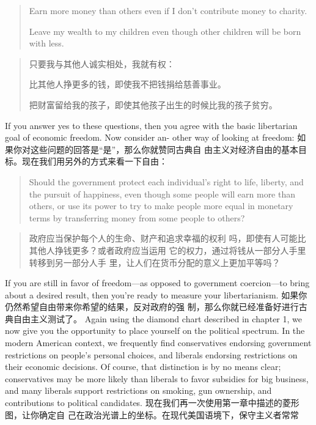 \begin{paracol}{2}
\begin{quotation}
	Earn more money than others even if I don't contribute money to charity.
	
	Leave my wealth to my children even though other children will be born with less.
\end{quotation}
\switchcolumn
\begin{quotation}
\noindent 只要我与其他人诚实相处，我就有权：

比其他人挣更多的钱，即使我不把钱捐给慈善事业。
	
把财富留给我的孩子，即使其他孩子出生的时候比我的孩子贫穷。
\end{quotation}
\switchcolumn*
If you answer yes to these questions, then you agree with the
basic libertarian goal of economic freedom. Now consider an-
other way of looking at freedom:
\switchcolumn
如果你对这些问题的回答是“是”，那么你就赞同古典自
由主义对经济自由的基本目标。现在我们用另外的方式来看一下自由：
\switchcolumn*
\begin{quote}
Should the government protect each individual's right to life,
liberty, and the pursuit of happiness, even though some people
will earn more than others, or use its power to try to make people more equal in monetary terms by transferring money from
some people to others?
\end{quote}
\switchcolumn
\begin{quote}
政府应当保护每个人的生命、财产和追求幸福的权利
吗，即使有人可能比其他人挣钱更多？或者政府应当运用
它的权力，通过将钱从一部分人手里转移到另一部分人手
里，让人们在货币分配的意义上更加平等吗？
\end{quote}
\switchcolumn*
If you are still in favor of freedom---as opposed to government coercion---to bring about a desired result, then you're
ready to measure your libertarianism.
\switchcolumn
如果你仍然希望自由带来你希望的结果，反对政府的强
制，那么你就已经准备好进行古典自由主义测试了。
\switchcolumn*
Again using the diamond chart described in chapter 1, we
now give you the opportunity to place yourself on the political
spectrum. In the modern American context, we frequently find
conservatives endorsing government restrictions on people's
personal choices, and liberals endorsing restrictions on their
economic decisions. Of course, that distinction is by no means
clear; conservatives may be more likely than liberals to favor
subsidies for big business, and many liberals support restrictions on smoking, gun ownership, and contributions to political
candidates.
\switchcolumn
现在我们再一次使用第一章中描述的菱形图，让你确定自
己在政治光谱上的坐标。在现代美国语境下，保守主义者常常

\end{paracol}
